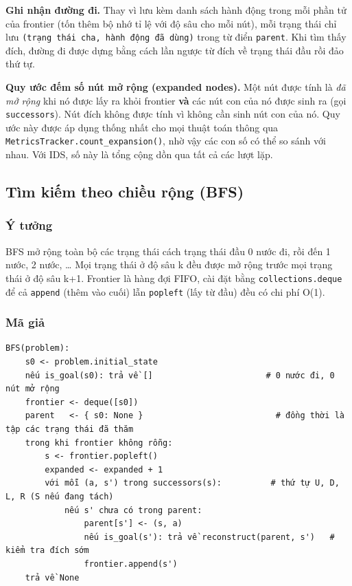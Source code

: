 \textbf{Ghi nhận đường đi.} Thay vì lưu kèm danh sách hành động trong mỗi phần tử của frontier (tốn thêm bộ nhớ tỉ lệ với độ sâu cho mỗi nút), mỗi trạng thái chỉ lưu \texttt{(trạng thái cha, hành động đã dùng)} trong từ điển \texttt{parent}. Khi tìm thấy đích, đường đi được dựng bằng cách lần ngược từ đích về trạng thái đầu rồi đảo thứ tự.

\textbf{Quy ước đếm số nút mở rộng (expanded nodes).} Một nút được tính là \emph{đã mở rộng} khi nó được lấy ra khỏi frontier \textbf{và} các nút con của nó được sinh ra (gọi \texttt{successors}). Nút đích không được tính vì không cần sinh nút con của nó. Quy ước này được áp dụng thống nhất cho mọi thuật toán thông qua \texttt{MetricsTracker.count\_\allowbreak{}expansion()}, nhờ vậy các con số có thể so sánh với nhau. Với IDS, số này là tổng cộng dồn qua tất cả các lượt lặp.

\subsection{Tìm kiếm theo chiều rộng (BFS)}

\subsubsection{Ý tưởng}

BFS mở rộng toàn bộ các trạng thái cách trạng thái đầu 0 nước đi, rồi đến 1 nước, 2 nước, … Mọi trạng thái ở độ sâu k đều được mở rộng trước mọi trạng thái ở độ sâu k+1. Frontier là hàng đợi FIFO, cài đặt bằng \texttt{collections.deque} để cả \texttt{append} (thêm vào cuối) lẫn \texttt{popleft} (lấy từ đầu) đều có chi phí O(1).

\subsubsection{Mã giả}

\begin{Verbatim}[breaklines=true, fontsize=\footnotesize, frame=single]
BFS(problem):
    s0 <- problem.initial_state
    nếu is_goal(s0): trả về []                       # 0 nước đi, 0 nút mở rộng
    frontier <- deque([s0])
    parent   <- { s0: None }                           # đồng thời là tập các trạng thái đã thăm
    trong khi frontier không rỗng:
        s <- frontier.popleft()
        expanded <- expanded + 1
        với mỗi (a, s') trong successors(s):          # thứ tự U, D, L, R (S nếu đang tách)
            nếu s' chưa có trong parent:
                parent[s'] <- (s, a)
                nếu is_goal(s'): trả về reconstruct(parent, s')   # kiểm tra đích sớm
                frontier.append(s')
    trả về None
\end{Verbatim}

